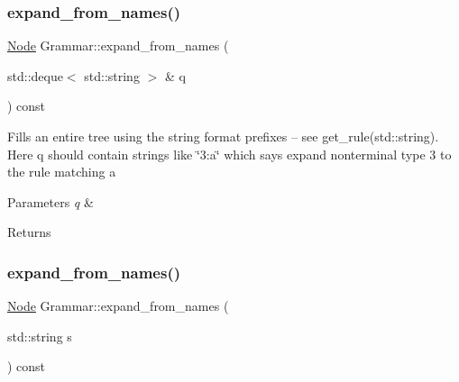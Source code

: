 \mbox{\label{class_grammar_ab5bd3d35545bcab4dbd3ca1d136bd4ce}} 
\subsubsection{\texorpdfstring{expand\+\_\+from\+\_\+names()}{expand\_from\_names()}\hspace{0.1cm}{\footnotesize\ttfamily [1/3]}}
{\footnotesize\ttfamily \hyperlink{class_node}{Node} Grammar\+::expand\+\_\+from\+\_\+names (\begin{DoxyParamCaption}\item[{std\+::deque$<$ std\+::string $>$ \&}]{q }\end{DoxyParamCaption}) const\hspace{0.3cm}{\ttfamily [inline]}}

Fills an entire tree using the string format prefixes -- see get\+\_\+rule(std\+::string). Here q should contain strings like \char`\"{}3\+:\textquotesingle{}a\textquotesingle{}\char`\"{} which says expand nonterminal type 3 to the rule matching \textquotesingle{}a\textquotesingle{} 
\begin{DoxyParams}{Parameters}
{\em q} & \\
\hline
\end{DoxyParams}
\begin{DoxyReturn}{Returns}

\end{DoxyReturn}
\mbox{\label{class_grammar_a44954a36c11d58c23bef02ca7d541005}} 
\subsubsection{\texorpdfstring{expand\+\_\+from\+\_\+names()}{expand\_from\_names()}\hspace{0.1cm}{\footnotesize\ttfamily [2/3]}}
{\footnotesize\ttfamily \hyperlink{class_node}{Node} Grammar\+::expand\+\_\+from\+\_\+names (\begin{DoxyParamCaption}\item[{std\+::string}]{s }\end{DoxyParamCaption}) const\hspace{0.3cm}{\ttfamily [inline]}}


